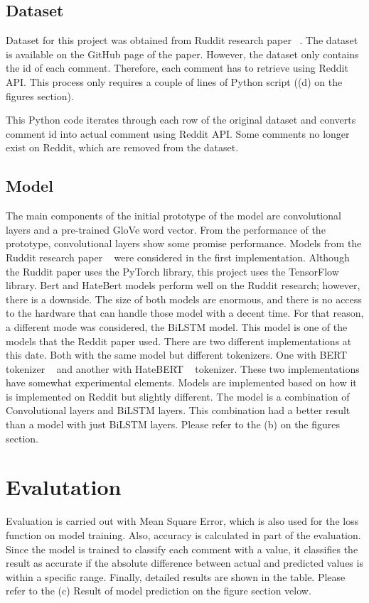 \documentclass[11pt, natbib=false]{article}
\begin{document}
\begin{multicols}{2}
\subsection{Dataset}
Dataset for this project was obtained from Ruddit research paper ~\cite{hada2021ruddit}.
The dataset is available on the GitHub page of the paper.
However, the dataset only contains the id of each comment.
Therefore, each comment has to retrieve using Reddit API.
This process only requires a couple of lines of Python script ((d) on the figures section).

This Python code iterates through each row of the original dataset and converts comment id into actual comment using Reddit API.
Some comments no longer exist on Reddit, which are removed from the dataset.


\subsection{Model}
The main components of the initial prototype of the model are convolutional layers and a pre-trained GloVe word vector. From the performance of the prototype, convolutional layers show some promise performance.
Models from the Ruddit research paper ~\cite{hada2021ruddit} were considered in the first implementation. Although the Ruddit paper uses the PyTorch library, this project uses the TensorFlow library.
Bert and HateBert models perform well on the Ruddit research; however, there is a downside.
The size of both models are enormous, and there is no access to the hardware that can handle those model with a decent time. For that reason, a different mode was considered, the BiLSTM model.
This model is one of the models that the Reddit paper used. There are two different implementations at this date.
Both with the same model but different tokenizers.
One with BERT tokenizer ~\cite{devlin2018bert} and another with HateBERT ~\cite{caselli2020hatebert} tokenizer.
These two implementations have somewhat experimental elements.
Models are implemented based on how it is implemented on Reddit but slightly different.
The model is a combination of Convolutional layers and BiLSTM layers.
This combination had a better result than a model with just BiLSTM layers.
Please refer to the (b) on the figures section.


\section{Evalutation}
Evaluation is carried out with Mean Square Error, which is also used for the loss function on model training.
Also, accuracy is calculated in part of the evaluation.
Since the model is trained to classify each comment with a value, it classifies the result as accurate if the absolute difference between actual and predicted values is within a specific range. Finally, detailed results are shown in the table. Please refer to the (c) Result of model prediction on the figure section velow.


\end{multicols}
\end{document}
